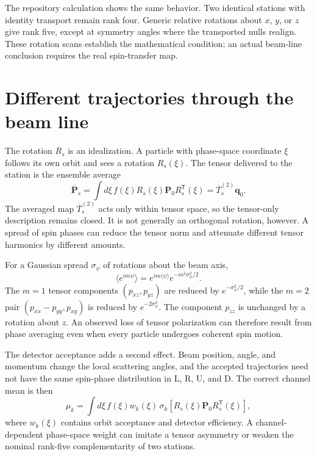 \documentclass[11pt,a4paper]{article}
\newcommand{\Tens}{\bm P}
\newcommand{\vect}[1]{\bm{#1}}
\begin{document}
The repository calculation shows the same behavior.  Two identical stations
with identity transport remain rank four.  Generic relative rotations about
$x$, $y$, or $z$ give rank five, except at symmetry angles where the transported
nulls realign.  These rotation scans establish the mathematical condition; an
actual beam-line conclusion requires the real spin-transfer map.

\section{Different trajectories through the beam line}

The rotation $R_s$ is an idealization.  A particle with phase-space coordinate
$\xi$ follows its own orbit and sees a rotation $R_s(\xi)$.  The tensor delivered
to the station is the ensemble average
\begin{equation}
 \overline{\Tens}_s
 =\int d\xi\,f(\xi)R_s(\xi)\Tens_0R_s^{\mathsf T}(\xi)
 =\overline{T}^{(2)}_s\vect q_0.
 \label{eq:ensemble-map}
\end{equation}
The averaged map $\overline{T}^{(2)}_s$ acts only within tensor space, so the
tensor-only description remains closed.  It is not generally an orthogonal
rotation, however.  A spread of spin phases can reduce the tensor norm and
attenuate different tensor harmonics by different amounts.

For a Gaussian spread $\sigma_\psi$ of rotations about the beam axis,
\begin{equation}
 \langle e^{im\psi}\rangle
 =e^{im\langle\psi\rangle}e^{-m^2\sigma_\psi^2/2}.
\end{equation}
The $m=1$ tensor components $(p_{xz},p_{yz})$ are reduced by
$e^{-\sigma_\psi^2/2}$, while the $m=2$ pair
$(p_{xx}-p_{yy},p_{xy})$ is reduced by $e^{-2\sigma_\psi^2}$.  The component
$p_{zz}$ is unchanged by a rotation about $z$.  An observed loss of tensor
polarization can therefore result from phase averaging even when every particle
undergoes coherent spin motion.

The detector acceptance adds a second effect.  Beam position, angle, and momentum
change the local scattering angles, and the accepted trajectories need not have
the same spin-phase distribution in L, R, U, and D.  The correct channel mean is
then
\begin{equation}
 \mu_k=\int d\xi\,f(\xi)w_k(\xi)\,
 \sigma_k\!\left[R_s(\xi)\Tens_0R_s^{\mathsf T}(\xi)\right],
 \label{eq:channel-ensemble}
\end{equation}
where $w_k(\xi)$ contains orbit acceptance and detector efficiency.  A
channel-dependent phase-space weight can imitate a tensor asymmetry or weaken the
nominal rank-five complementarity of two stations.
\end{document}

